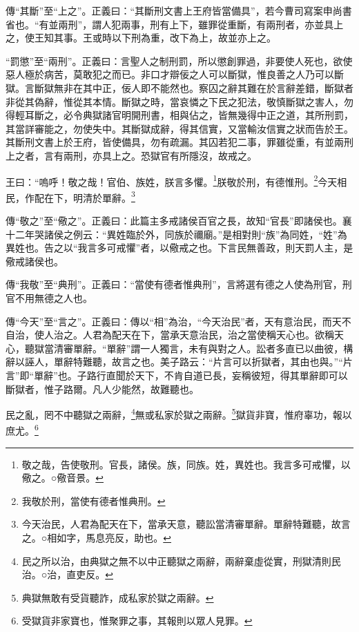 {\noindent\zhuan{}\fzbyks 傳“其斷”至“上之”。正義曰：“其斷刑文書上王府皆當備具”，若今曹司寫案申尚書省也。“有並兩刑”，謂人犯兩事，刑有上下，雖罪從重斷，有兩刑者，亦並具上之，使王知其事。王或時以下刑為重，改下為上，故並亦上之。 \par}

{\noindent\shu{}\fzkt “罰懲”至“兩刑”。正義曰：言聖人之制刑罰，所以懲創罪過，非要使人死也，欲使惡人極於病苦，莫敢犯之而已。非口才辯佞之人可以斷獄，惟良善之人乃可以斷獄。言斷獄無非在其中正，佞人即不能然也。察囚之辭其難在於言辭差錯，斷獄者非從其偽辭，惟從其本情。斷獄之時，當哀憐之下民之犯法，敬慎斷獄之害人，勿得輕耳斷之，必令典獄諸官明開刑書，相與佔之，皆無幾得中正之道，其所刑罰，其當詳審能之，勿使失中。其斷獄成辭，得其信實，又當輸汝信實之狀而告於王。其斷刑文書上於王府，皆使備具，勿有疏漏。其囚若犯二事，罪雖從重，有並兩刑上之者，言有兩刑，亦具上之。恐獄官有所隱沒，故戒之。 \par}

王曰：“嗚呼！敬之哉！官伯、族姓，朕言多懼。\footnote{敬之哉，告使敬刑。官長，諸侯。族，同族。姓，異姓也。我言多可戒懼，以儆之。○儆音景。}朕敬於刑，有德惟刑。\footnote{我敬於刑，當使有德者惟典刑。}今天相民，作配在下，明清於單辭。\footnote{今天治民，人君為配天在下，當承天意，聽訟當清審單辭。單辭特難聽，故言之。○相如字，馬息亮反，助也。}


{\noindent\zhuan{}\fzbyks 傳“敬之”至“儆之”。正義曰：此篇主多戒諸侯百官之長，故知“官長”即諸侯也。襄十二年哭諸侯之例云：“異姓臨於外，同族於禰廟。”是相對則“族”為同姓，“姓”為異姓也。告之以“我言多可戒懼”者，以儆戒之也。下言民無善政，則天罰人主，是儆戒諸侯也。 \par}

{\noindent\zhuan{}\fzbyks 傳“我敬”至“典刑”。正義曰：“當使有德者惟典刑”，言將選有德之人使為刑官，刑官不用無德之人也。 \par}

{\noindent\zhuan{}\fzbyks 傳“今天”至“言之”。正義曰：傳以“相”為治，“今天治民”者，天有意治民，而天不自治，使人治之。人君為配天在下，當承天意治民，治之當使稱天心也。欲稱天心，聽獄當清審單辭。“單辭”謂一人獨言，未有與對之人。訟者多直已以曲彼，構辭以誣人，單辭特難聽，故言之也。美子路云：“片言可以折獄者，其由也與。”“片言”即“單辭”也。子路行直聞於天下，不肯自道已長，妄稱彼短，得其單辭即可以斷獄者，惟子路爾。凡人少能然，故難聽也。 \par}

民之亂，罔不中聽獄之兩辭，\footnote{民之所以治，由典獄之無不以中正聽獄之兩辭，兩辭棄虛從實，刑獄清則民治。○治，直吏反。}無或私家於獄之兩辭。\footnote{典獄無敢有受貨聽詐，成私家於獄之兩辭。}獄貨非寶，惟府辜功，報以庶尤。\footnote{受獄貨非家寶也，惟聚罪之事，其報則以眾人見罪。}


